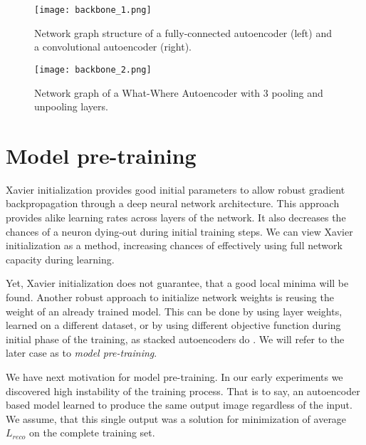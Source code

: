 \begin{figure}[H]
  \centering
  \texttt{[image: backbone\_1.png]}
  \caption{Network graph structure of a fully-connected autoencoder (left) and a convolutional autoencoder (right).}
  \label{fig:tf_graph_1}
\end{figure}
\begin{figure}[H]
  \centering
    \texttt{[image: backbone\_2.png]}
  \caption{Network graph of a What-Where Autoencoder with 3 pooling and unpooling layers.}
  \label{fig:tf_graph_2}
\end{figure}

\section{Model pre-training}

Xavier initialization provides good initial parameters to allow robust gradient backpropagation through a deep neural network architecture.
This approach provides alike learning rates across layers of the network.
It also decreases the chances of a neuron dying-out during initial training steps.
We can view Xavier initialization as a method, increasing chances of effectively using full network capacity during learning.

Yet, Xavier initialization does not guarantee, that a good local minima will be found.
Another robust approach to initialize network weights is reusing the weight of an already trained model.
This can be done by using layer weights, learned on a different dataset, or by using different objective function during initial phase of the training, as stacked autoencoders do \cite{Yosinski2014}.
We will refer to the later case as to \textit{model pre-training}.

We have next motivation for model pre-training.
In our early experiments we discovered high instability of the training process.
That is to say, an autoencoder based model learned to produce the same output image regardless of the input.
We assume, that this single output was a solution for minimization of average $L_{reco}$ on the complete training set.

